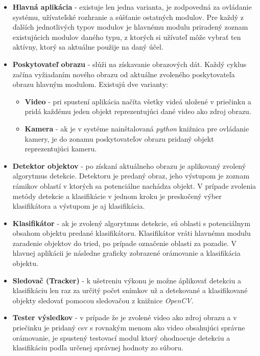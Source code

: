         \begin{itemize}
            \item \textbf{Hlavná aplikácia} - existuje len jedna varianta, je zodpovedná za ovládanie systému, užívateľské rozhranie a súšťanie ostatných modulov. Pre každý z ďalších jednotlivých typov modulov je hlavnému modulu priradený zoznam existujúcich modulov daného typu, z ktorých si užívateľ môže vybrať ten aktívny, ktorý sa aktuálne použije na daný účel.
            \item \textbf{Poskytovateľ obrazu} - slúži na získavanie obrazových dát. Každý cyklus začína vyžiadaním nového obrazu od aktuálne zvoleného poskytovateľa obrazu hlavným modulom. Existujú dve varianty:
            \begin{itemize}
                \item \textbf{Video} - pri spustení aplikácia načíta všetky videá uložené v priečinku  a pridá každému jeden objekt reprezentujúci dané video ako zdroj obrazu.
                \item \textbf{Kamera} - ak je v systéme nainštalovaná \emph{python} knižnica pre ovládanie kamery, je do zonamu poskytovateľov obrazu pridaný objekt reprezentujúci kameru.
            \end{itemize}
            \item \textbf{Detektor objektov} - po získaní aktuálneho obrazu je aplikovaný zvolený algorytmus detekcie. Detektoru je predaný obraz, jeho výstupom je zoznam rámikov oblastí v ktorých sa potenciálne nachádza objekt. V prípade zvolenia metódy detekcie a klasifikácie v jednom kroku je preskočený výber klasifikátora a výstupom je aj klasifikácia. 
            \item \textbf{Klasifikátor} - ak je zvolený algorytmus detekcie, sú oblasti s potenciálnym obsahom objektu predané klasifikátoru. Klasifikátor vráti hlavnému modulu zaradenie objektov do tried, po prípade označenie oblasti za pozadie. V hlavnej aplikácii je následne graficky zobrazené orámovanie a klasifikácia objektu.
            \item \textbf{Sledovač (Tracker)} - k ušetreniu výkonu je možne áplikovať detekciu a klasifikáciu len raz za určitý počet snímkov už a detekované a klasifikované objekty sledovať pomocou sledovačou z knižnice \emph{OpenCV}.
            \item \textbf{Tester výsledkov} - v prípade že je zvolené video ako zdroj obrazu a v priečinku  je pridaný \ac{csv} s rovnakým menom ako video obsahujúci správne orámovanie, je spustený testovací modul ktorý ohodnocuje detekciu a klasifikáciu podľa určenej správnej hodnoty zo súboru.
        \end{itemize}

